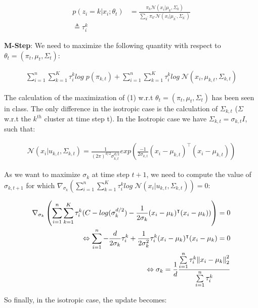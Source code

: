 \documentclass[11pt]{article}
\numberwithin{figure}{section} %
\begin{document}
\begin{align*}
p(z_i = k | x_i; \theta_t) &= \frac{\pi_k \mathcal{N}(x_i | \mu_k, \Sigma_k)}{\sum\limits_{k^{\prime}} \pi_{k\prime} \mathcal{N}(x_i | \mu_{k^{\prime}}, \Sigma_{k^{\prime}})} \\
\triangleq \tau^{k}_i
\end{align*}

\textbf{M-Step}: We need to maximize the following quantity with respect to $\theta_t = (\pi_t, \mu_t, \Sigma_t)$:

\begin{align}
\sum\limits_{i=1}^n \sum\limits_{k=1}^K \tau^{k}_i log \; p(\pi_{k,t}) + \sum\limits_{i=1}^n \sum\limits_{k=1}^K \tau^{k}_i log \; \mathcal{N}(x_i, \mu_{k,t}, \Sigma_{k,t})
\end{align}

The calculation of the maximization of (1) w.r.t $\theta_t = (\pi_t, \mu_t, \Sigma_t)$ has been seen in class. The only difference in the isotropic case is the calculation of $\Sigma_{k,t}$ ($\Sigma$ w.r.t the $k^{th}$ cluster at time step t). In the Isotropic case we have $\Sigma_{k,t} = \sigma_{k,t} I$, such that:

\begin{align*}
\mathcal{N}(x_i|u_{k,t}, \Sigma_{k,t}) = \frac{1}{(2\pi)^{d/2}\sigma_{k,t}^{d/2}}
exp\left(\frac{-1}{2\sigma_{k,t}}(x_i - \mu_{k,t})^{\intercal}(x_i - \mu_{k,t})\right)
\end{align*}

As we want to maximize $\sigma_{k}$ at time step $t+1$, we need to compute the value
of $\sigma_{k,t+1}$ for which $\nabla_{\sigma_k}\left(\sum\limits_{i=1}^n\sum\limits_{k=1}^K \tau^{k}_i log\; \mathcal{N}(x_i|u_{k,t}, \Sigma_{k,t})\right) = 0$:

\begin{align*}
\nabla_{\sigma_k}\left(\sum\limits_{i=1}^n\sum\limits_{k=1}^K \tau^{k}_i (C - log(\sigma^{d/2}_{k}) - \frac{1}{2 \sigma_k}(x_i - \mu_{k})^{\intercal}(x_i - \mu_{k}))\right) = 0\\
\Leftrightarrow \sum\limits_{i=1}^n -\frac{d}{2 \sigma_k}\tau^{k}_i + \frac{1}{2 \sigma^2_k} \tau^{k}_i (x_i - \mu_{k})^{\intercal}(x_i - \mu_{k}) = 0 \\
\Leftrightarrow \sigma_k = \frac{1}{d}\frac{\sum\limits_{i=1}^n \tau^{k}_i \norm{x_i - \mu_k}^2_2}{\sum\limits_{i=1}^n \tau^{k}_i}
\end{align*}

So finally, in the isotropic case, the update becomes:
\end{document}
